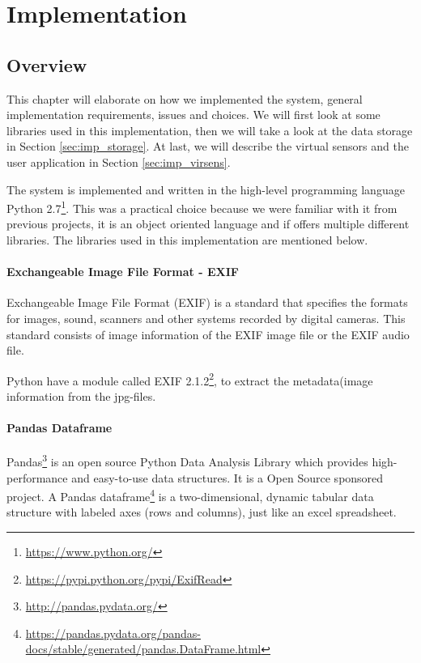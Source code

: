 \documentclass[USenglish]{uit-thesis}
\begin{document}
\chapter{Implementation}
\section{Overview}
This chapter will elaborate on how we implemented the system, general implementation requirements, issues and choices. 
We will first look at some libraries used in this implementation, then we will take a look at the data storage in Section \ref{sec:imp_storage}. At last, we will describe the virtual sensors and the user application in Section \ref{sec:imp_virsens}.

The system is implemented and written in the high-level programming language Python 2.7\footnote{\url{https://www.python.org/}}. This was a practical choice because we were familiar with it from previous projects, it is an object oriented language and if offers multiple different libraries. The libraries used in this implementation are mentioned below.


\subsubsection{Exchangeable Image File Format - EXIF} \label{sssec:imp_exif}
Exchangeable Image File Format (EXIF) is a standard that specifies the formats for images, sound, scanners and other systems recorded by digital cameras. This standard consists of image information of the EXIF image file or the EXIF audio file.

Python have a module called  EXIF 2.1.2\footnote{\url{https://pypi.python.org/pypi/ExifRead}}, to extract the metadata(image information from the jpg-files.

\subsubsection{Pandas Dataframe} \label{sssec:imp_df}
Pandas\footnote{\url{http://pandas.pydata.org/}} is an open source Python Data Analysis Library which provides high-performance and easy-to-use data structures. It is a Open Source sponsored project. A Pandas dataframe\footnote{\url{https://pandas.pydata.org/pandas-docs/stable/generated/pandas.DataFrame.html}} is a two-dimensional, dynamic tabular data structure with labeled axes (rows and columns), just like an excel spreadsheet.
\end{document}
